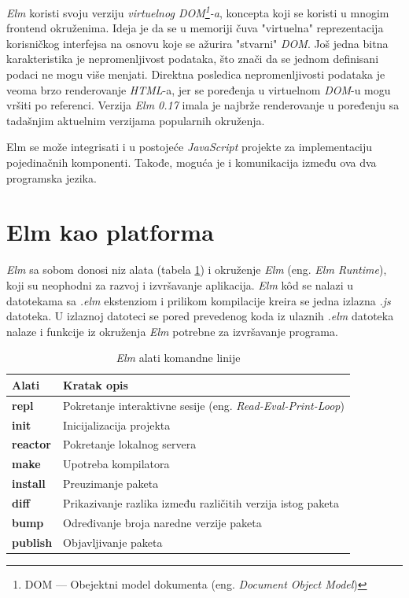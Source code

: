 \documentclass[12pt,oneside]{memoir}
\begin{document}
\emph{Elm} koristi svoju verziju \emph{virtuelnog DOM\footnote{DOM --- Obejektni model
dokumenta (eng. \emph{Document Object Model})\cite{dom}}-a}, koncepta koji se koristi u mnogim
frontend okruženima. Ideja je da se u memoriji čuva "virtuelna" reprezentacija
korisničkog interfejsa na osnovu koje se ažurira "stvarni" \emph{DOM}. Još jedna bitna
karakteristika je nepromenljivost podataka, što znači da se jednom definisani
podaci ne mogu više menjati. Direktna posledica nepromenljivosti podataka je veoma
brzo renderovanje \emph{HTML}-a, jer se poređenja u virtuelnom \emph{DOM}-u mogu vršiti po referenci. 
Verzija \emph{Elm 0.17} imala je najbrže renderovanje u poređenju sa tadašnjim aktuelnim verzijama 
popularnih okruženja\cite{elm-html}.

Elm se može integrisati i u postojeće \emph{JavaScript} projekte za implementaciju pojedinačnih 
komponenti. Takođe, moguća je i komunikacija između ova dva programska jezika. 

\section{Elm kao platforma}
\emph{Elm} sa sobom donosi niz alata (tabela \ref{table:elmTools}) i okruženje \emph{Elm} (eng. \emph{Elm 
Runtime}), koji su neophodni za razvoj i izvršavanje aplikacija. \emph{Elm} k\^{o}d se nalazi u 
datotekama sa \emph{.elm} ekstenziom i prilikom kompilacije kreira se jedna izlazna 
\emph{.js} datoteka. U izlaznoj datoteci se pored prevedenog koda iz ulaznih \emph{.elm} 
datoteka nalaze i funkcije iz okruženja \emph{Elm} potrebne za izvršavanje programa.

\begin{table}[h!]
\centering
\begin{tabular}{|l l|} 
 \hline 
 Alati & Kratak opis  \\ [0.5ex] 
 \hline
  \textbf{repl} & Pokretanje interaktivne sesije (eng. \emph{Read-Eval-Print-Loop}) \\ 
  \textbf{init} & Inicijalizacija projekta \\
  \textbf{reactor} & Pokretanje lokalnog servera \\
  \textbf{make} & Upotreba kompilatora \\
  \textbf{install}  & Preuzimanje paketa \\ 
  \textbf{diff} & Prikazivanje razlika između različitih verzija istog paketa \\
  \textbf{bump} & Određivanje broja naredne verzije paketa  \\
  \textbf{publish} & Objavljivanje paketa \\[1ex] 
 \hline
\end{tabular}
\caption{\emph{Elm} alati komandne linije}
\label{table:elmTools}
\end{table}
\end{document}
